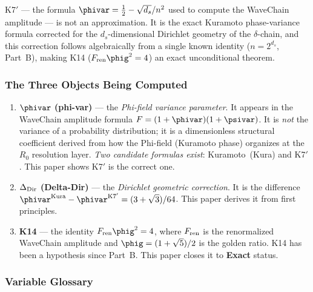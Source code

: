 \documentclass[12pt, a4paper]{article}
\begin{document}
K7$'$ --- the formula $\phivar = \tfrac{1}{2} - \sqrt{d_s}/n^2$
used to compute the WaveChain amplitude --- is not an approximation.
It is the exact Kuramoto phase-variance formula corrected for the
$d_s$-dimensional Dirichlet geometry of the $\delta$-chain, and
this correction follows algebraically from a single known identity
($n = 2^{d_s}$, Part~B), making K14 ($F_{\rm ren}\phig^2 = 4$)
an exact unconditional theorem.

\subsubsection*{The Three Objects Being Computed}

\begin{keybox}[title={Three Objects Central to This Paper}]
\begin{enumerate}[leftmargin=2em]
  \item \textbf{$\phivar$ (phi-var)} --- the \emph{Phi-field variance
    parameter}. It appears in the WaveChain amplitude formula
    $F = (1+\phivar)(1+\psivar)$.
    It is \emph{not} the variance of a probability distribution;
    it is a dimensionless structural coefficient derived from
    how the Phi-field (Kuramoto phase) organizes at the $R_0$
    resolution layer.
    \emph{Two candidate formulas exist}: Kuramoto~(Kura) and K7$'$.
    This paper shows K7$'$ is the correct one.

  \item \textbf{$\Delta_{\rm Dir}$ (Delta-Dir)} ---
    the \emph{Dirichlet geometric correction}.
    It is the difference
    $\phivar^{\rm Kura} - \phivar^{\rm K7'} = (3+\sqrt{3})/64$.
    This paper derives it from first principles.

  \item \textbf{K14} --- the identity $F_{\rm ren}\phig^2 = 4$,
    where $F_{\rm ren}$ is the renormalized WaveChain amplitude
    and $\phig = (1+\sqrt{5})/2$ is the golden ratio.
    K14 has been a hypothesis since Part~B.
    This paper closes it to \textbf{Exact} status.
\end{enumerate}
\end{keybox}

\subsubsection*{Variable Glossary}
\end{document}
